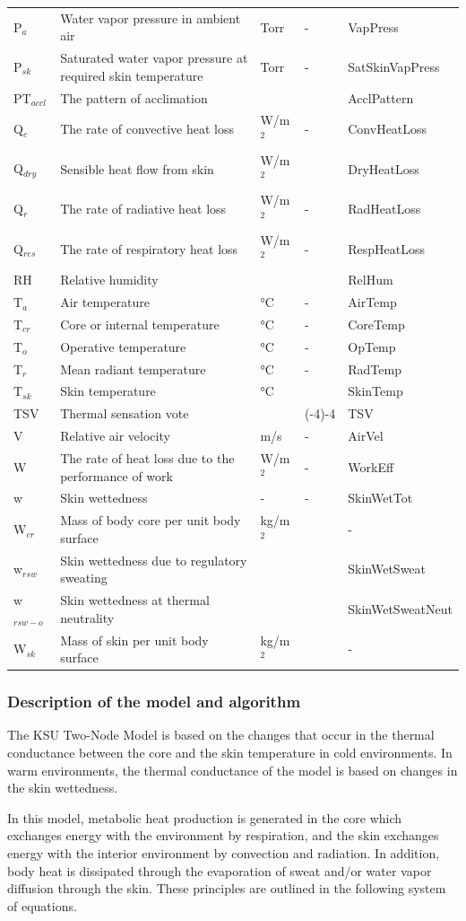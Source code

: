 \begin{longtable}[c]{p{1.2in}p{2.0in}p{0.8in}p{0.8in}p{1.2in}}
P\(_{a}\) & Water vapor pressure in ambient air & Torr & - & VapPress \tabularnewline
P\(_{sk}\) & Saturated water vapor pressure at required skin temperature & Torr & - & SatSkinVapPress \tabularnewline
PT\(_{accl}\) & The pattern of acclimation & ~ & ~ & AcclPattern \tabularnewline
Q\(_{c}\) & The rate of convective heat loss & W/m\(^{2}\) & - & ConvHeatLoss \tabularnewline
Q\(_{dry}\) & Sensible heat flow from skin & W/m\(^{2}\) & ~ & DryHeatLoss \tabularnewline
Q\(_{r}\) & The rate of radiative heat loss & W/m\(^{2}\) & - & RadHeatLoss \tabularnewline
Q\(_{res}\) & The rate of respiratory heat loss & W/m\(^{2}\) & - & RespHeatLoss \tabularnewline
RH & Relative humidity & ~ & ~ & RelHum \tabularnewline
T\(_{a}\) & Air temperature & °C & - & AirTemp \tabularnewline
T\(_{cr}\) & Core or internal temperature & °C & - & CoreTemp \tabularnewline
T\(_{o}\) & Operative temperature & °C & - & OpTemp \tabularnewline
T\(_{r}\) & Mean radiant temperature & °C & - & RadTemp \tabularnewline
T\(_{sk}\) & Skin temperature & °C & ~ & SkinTemp \tabularnewline
TSV & Thermal sensation vote & ~ & (-4)-4 & TSV \tabularnewline
V & Relative air velocity & m/s & - & AirVel \tabularnewline
W & The rate of heat loss due to the performance of work & W/m\(^{2}\) & - & WorkEff \tabularnewline
w & Skin wettedness & - & - & SkinWetTot \tabularnewline
W\(_{cr}\) & Mass of body core per unit body surface & kg/m\(^{2}\) & ~ & - \tabularnewline
w\(_{rsw}\) & Skin wettedness due to regulatory sweating & ~ & ~ & SkinWetSweat \tabularnewline
w\(_{rsw-o}\) & Skin wettedness at thermal neutrality & ~ & ~ & SkinWetSweatNeut \tabularnewline
W\(_{sk}\) & Mass of skin per unit body surface & kg/m\(^{2}\) & ~ & - \tabularnewline
\bottomrule
\end{longtable}

\subsubsection{Description of the model and algorithm}\label{description-of-the-model-and-algorithm-2}

The KSU Two-Node Model is based on the changes that occur in the thermal conductance between the core and the skin temperature in cold environments. In warm environments, the thermal conductance of the model is based on changes in the skin wettedness.

In this model, metabolic heat production is generated in the core which exchanges energy with the environment by respiration, and the skin exchanges energy with the interior environment by convection and radiation. In addition, body heat is dissipated through the evaporation of sweat and/or water vapor diffusion through the skin. These principles are outlined in the following system of equations.

